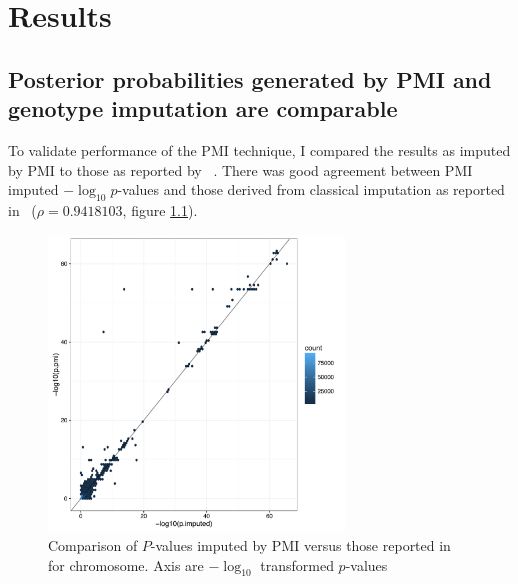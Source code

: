 \documentclass[a4paper,11pt]{report}
\begin{document}


\chapter{Results}

\section{Posterior probabilities generated by PMI and genotype imputation are comparable}

To validate performance of the PMI technique, I compared the results as imputed by PMI to those as reported by  ~\citep{Okada2014-um}. There was good agreement between PMI imputed $- \log_{10} p$-values and those derived from classical imputation as reported in~\citet{Okada2014-um} ($\rho=0.9418103$, figure \ref{fig:pmi_comparison}). %

\begin{figure}[h]
\centering
\includegraphics[width=0.7\textwidth]{pmi_vs_imp.pdf}
\caption{Comparison of $P$-values imputed by PMI versus those reported in ~\citep{Okada2014-um} for chromosome. Axis are $-\log_{10}$ transformed $p$-values}
\label{fig:pmi_comparison}
\end{figure}
\end{document}
